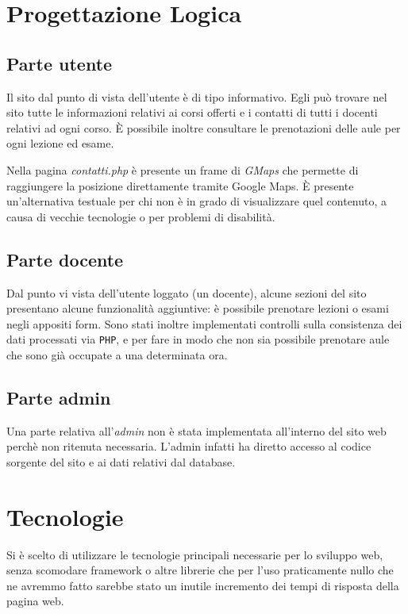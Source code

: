 \documentclass[12pt, a4paper]{article}
\newcommand*{\egrave}{\MakeUppercase{è} }
\begin{document}
\section{Progettazione Logica}

\subsection{Parte utente}
Il sito dal punto di vista dell'utente è di tipo informativo. Egli può trovare nel sito
tutte le informazioni relativi ai corsi offerti e i contatti di tutti i docenti relativi
ad ogni corso. \egrave possibile inoltre consultare le prenotazioni delle aule per ogni
lezione ed esame.\par
Nella pagina \textit{contatti.php} è presente un frame di \emph{GMaps} che permette di 
raggiungere la posizione direttamente tramite Google Maps. \egrave presente un'alternativa 
testuale per chi non è in grado di visualizzare quel contenuto, a causa di vecchie tecnologie
o per problemi di disabilità.

\subsection{Parte docente}
Dal punto vi vista dell'utente loggato (un docente), alcune sezioni del sito
presentano alcune funzionalità aggiuntive: è possibile prenotare lezioni o esami negli 
appositi form. Sono stati inoltre implementati controlli sulla consistenza dei dati
processati via \texttt{PHP}, e per fare in modo che non sia possibile prenotare aule che sono già 
occupate a una determinata ora. \par

\subsection{Parte admin}
Una parte relativa all'\emph{admin} non è stata implementata all'interno del sito web 
perchè non ritenuta necessaria. L'admin infatti ha diretto accesso al codice sorgente
del sito e ai dati relativi dal database.

\section{Tecnologie}
Si è scelto di utilizzare le tecnologie principali necessarie per lo sviluppo web, senza
scomodare framework o altre librerie che per l'uso praticamente nullo che ne avremmo fatto
sarebbe stato un inutile incremento dei tempi di risposta della pagina web.
\end{document}
